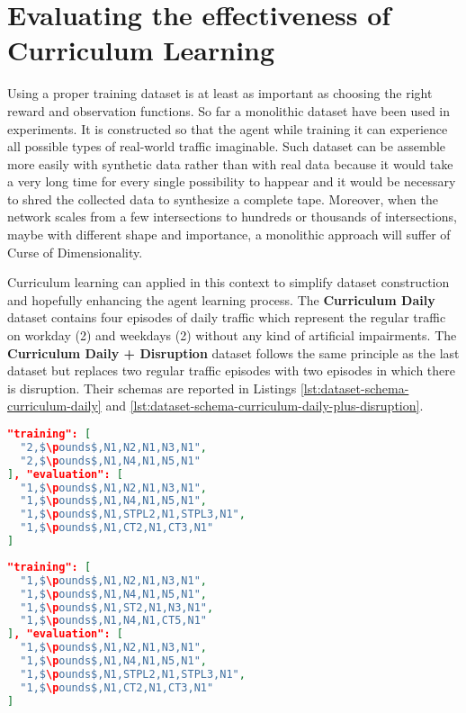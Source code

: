 \section{Evaluating the effectiveness of Curriculum Learning}

Using a proper training dataset is at least as important as choosing the right reward and observation functions.
So far a monolithic dataset have been used in experiments.
It is constructed so that the agent while training it can experience all possible types of real-world traffic imaginable.
Such dataset can be assemble more easily with synthetic data rather than with real data because it would take a very long time for every single possibility to happear and it would be necessary to shred the collected data to synthesize a complete tape.
Moreover, when the network scales from a few intersections to hundreds or thousands of intersections, maybe with different shape and importance, a monolithic approach will suffer of Curse of Dimensionality.

Curriculum learning can applied in this context to simplify dataset construction and hopefully enhancing the agent learning process.
The \textbf{Curriculum Daily} dataset contains four episodes of daily traffic which represent the regular traffic on workday (2) and weekdays (2) without any kind of artificial impairments.
The \textbf{Curriculum Daily + Disruption} dataset follows the same principle as the last dataset but replaces two regular traffic episodes with two episodes in which there is disruption.
Their schemas are reported in Listings \ref{lst:dataset-schema-curriculum-daily} and \ref{lst:dataset-schema-curriculum-daily-plus-disruption}.

\noindent
\begin{minipage}{\linewidth}
\begin{lstlisting}[language=JSON, caption=The schema for the "Curriculum Daily" Dataset, label={lst:dataset-schema-curriculum-daily}, mathescape=true]
"training": [
  "2,$\pounds$,N1,N2,N1,N3,N1",
  "2,$\pounds$,N1,N4,N1,N5,N1"
], "evaluation": [
  "1,$\pounds$,N1,N2,N1,N3,N1",
  "1,$\pounds$,N1,N4,N1,N5,N1",
  "1,$\pounds$,N1,STPL2,N1,STPL3,N1",
  "1,$\pounds$,N1,CT2,N1,CT3,N1"
]
\end{lstlisting}
\end{minipage}

\noindent
\begin{minipage}{\linewidth}
\begin{lstlisting}[language=JSON, caption=The schema for the "Curriculum Daily + Disruption" Dataset, label={lst:dataset-schema-curriculum-daily-plus-disruption}, mathescape=true]
"training": [
  "1,$\pounds$,N1,N2,N1,N3,N1",
  "1,$\pounds$,N1,N4,N1,N5,N1",
  "1,$\pounds$,N1,ST2,N1,N3,N1",
  "1,$\pounds$,N1,N4,N1,CT5,N1"
], "evaluation": [
  "1,$\pounds$,N1,N2,N1,N3,N1",
  "1,$\pounds$,N1,N4,N1,N5,N1",
  "1,$\pounds$,N1,STPL2,N1,STPL3,N1",
  "1,$\pounds$,N1,CT2,N1,CT3,N1"
]
\end{lstlisting}
\end{minipage}


